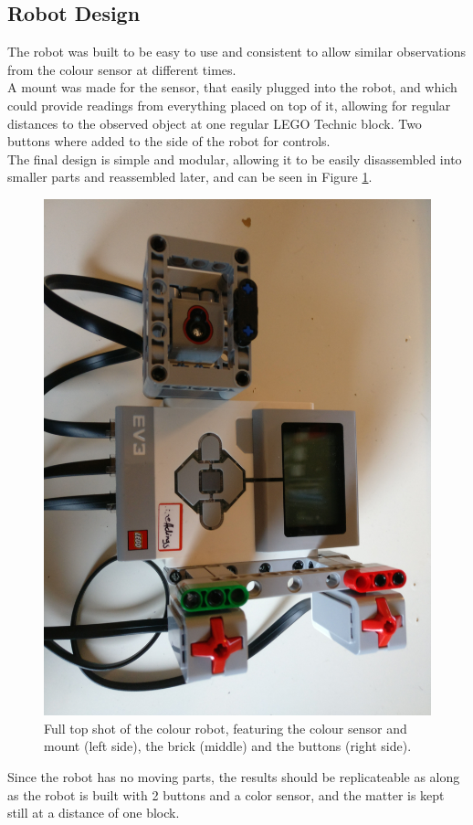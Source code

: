 \documentclass[11pt, a4paper]{article}
\begin{document}
\subsection{Robot Design}
The robot was built to be easy to use and consistent to allow similar observations from the colour sensor at different times. \\
A mount was made for the sensor, that easily plugged into the robot, and which could provide readings from everything placed on top of it, allowing for regular distances to the observed object at one regular LEGO Technic block. Two buttons where added to the side of the robot for controls. \\
The final design is simple and modular, allowing it to be easily disassembled into smaller parts and reassembled later, and can be seen in Figure \ref{fig:colour_robot_full_shot}. \\
\begin{figure}[H]
	\centering
	\includegraphics[scale=0.05,angle=90]{images/colour_robot_full.jpg} 	
	\caption{Full top shot of the colour robot, featuring the colour sensor and mount (left side), the brick (middle) and the buttons (right side).}
	\label{fig:colour_robot_full_shot}
\end{figure}
Since the robot has no moving parts, the results should be replicateable as along as the robot is built with 2 buttons and a color sensor, and the matter is kept still at a distance of one block.
\end{document}
